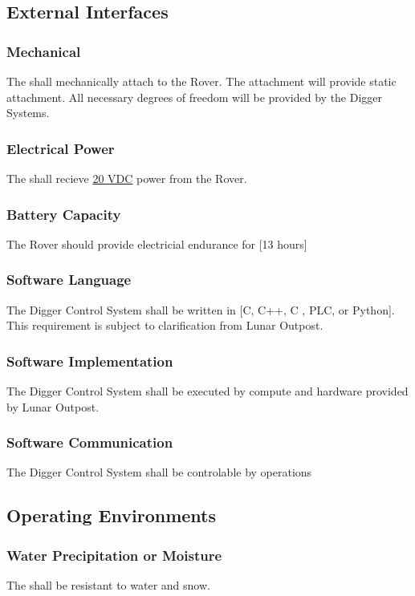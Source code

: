 \subsection{External Interfaces}
\subsubsection{Mechanical}
\label{ref:Mechanical}
The  shall mechanically attach to the Rover. The attachment will provide static attachment.
\label{ref:Mechanical}
All necessary degrees of freedom will be provided by the Digger Systems.
\subsubsection{Electrical Power}
\label{ref:Electrical Power}
The  shall recieve \hyperref[term:Excavation Power Interface]{20 VDC} power from the Rover. 
\subsubsection{Battery Capacity}
\label{ref:Battery Capacity}
The Rover should provide electricial endurance for [13 hours]
\subsubsection{Software Language}
\label{ref:Software Language}
The Digger Control System shall be written in [C, C++, C , PLC, or Python]. This requirement is subject to clarification from Lunar Outpost.
\subsubsection{Software Implementation}
\label{ref:Software Implementation}
The Digger Control System shall be executed by compute and hardware provided by Lunar Outpost.
\subsubsection{Software Communication}
\label{ref:Software Communication}
The Digger Control System shall be controlable by operations
\subsection{Operating Environments}
\subsubsection{Water Precipitation or Moisture}
\label{ref:Water Precipitation or Moisture}
The  shall be resistant to water and snow. 
